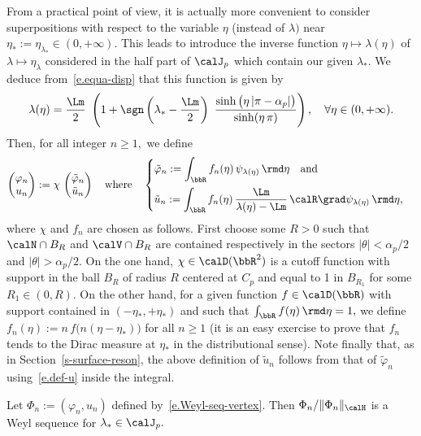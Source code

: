 From a practical point of view, it is actually more convenient to consider superpositions with respect to the variable $\eta$ (instead of $\lambda)$ near $\eta_* := \eta_{\lambda_*} \in (0,+\infty).$ This leads to introduce the inverse function $\eta \mapsto \lambda(\eta)$ of $\lambda \mapsto \eta_\lambda$ considered in the half part of $\calJ_p$ which contain our given $\lambda_*.$ We deduce from~\eqref{e.equa-disp} that this function is given by
\[
\lambda(\eta) = \frac{\Lm}{2}\ \left(1 + \sgn\left(\lambda_* - \frac{\Lm}{2}\right) \
\frac{\sinh\big(\eta\,|\pi-\alpha_p|\big)}{\sinh(\eta\,\pi)}
\right),
\quad\forall \eta \in (0,+\infty).
\]
Then, for all integer $n \geq 1,$ we define
\begin{equation}\label{e.Weyl-seq-vertex}
\begin{pmatrix} \varphi_n \\ u_n
\end{pmatrix}
:= \chi\,
\begin{pmatrix} \tilde \varphi_n \\ \tilde u_n
\end{pmatrix}
\quad\text{where}\quad
\begin{cases}
\displaystyle \tilde\varphi_n := \int_\bbR f_n(\eta)\, \psi_{\lambda(\eta)} \,\rmd\eta \quad\text{and} \\[10pt]
\displaystyle \tilde u_n := \int_\bbR f_n(\eta)\, \frac{\Lm}{\lambda(\eta)-\Lm}\,\calR \grad\psi_{\lambda(\eta)} \,\rmd\eta,
\end{cases}
\end{equation}
where $\chi$ and $f_n$ are chosen as follows. First choose some $R>0$ such that $\calN \cap B_R$ and $\calV \cap B_R$ are contained respectively in the sectors $|\theta| < \alpha_p/2$ and $|\theta| > \alpha_p/2$. On the one hand, $\chi \in \calD(\bbR^2)$ is a cutoff function with support in the ball $B_R$ of radius $R$ centered at $C_p$ and equal to 1 in $B_{R_1}$ for some $R_1 \in (0,R).$ On the other hand, for a given function $f \in \calD(\bbR)$ with support contained in $(-\eta_*,+\eta_*)$ and such that $\int_\bbR f(\eta) \,\rmd\eta = 1,$ we define $f_n(\eta) := n\,f\big(n(\eta-\eta_*)\big)$ for all $n \geq 1$ (it is an easy exercise to prove that $f_n$ tends to the Dirac measure at $\eta_*$ in the distributional sense). Note finally that, as in Section~\ref{s-surface-reson}, the above definition of $\tilde u_n$ follows from that of $\tilde\varphi_n$ using~\eqref{e.def-u} inside the integral.

\begin{prop}\label{p-Weyl-inner-corner}
Let $\Phi_n := (\varphi_n,u_n)$ defined by~\eqref{e.Weyl-seq-vertex}. Then $\Phi_n/\|\Phi_n\|_\calH$ is a Weyl sequence for $\lambda_* \in \calJ_p.$
\end{prop}

